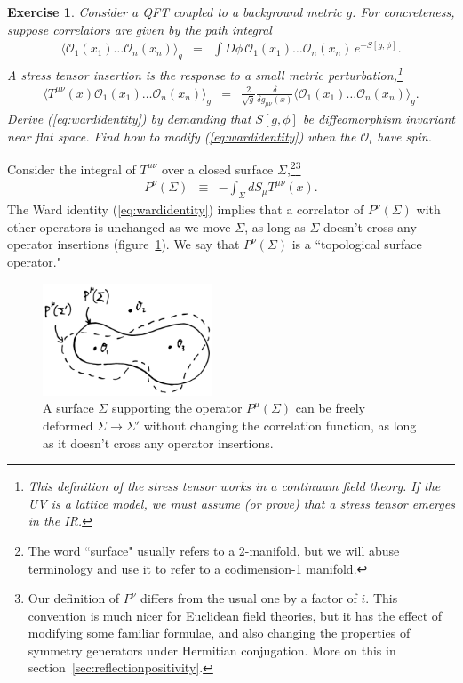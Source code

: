 \documentclass[11pt]{ws-rv9x6}
\newcommand\be{\begin{eqnarray}}
\newcommand\ee{\end{eqnarray}}
\newcommand\f\phi
\newcommand\cO{\mathcal{O}}
\newcommand\<\langle
\renewcommand\>\rangle
\newcommand\de\delta
\renewcommand\.{\cdot}
\newtheorem{exercise}{Exercise}[section]
\begin{document}
\begin{exercise}
Consider a QFT coupled to a background metric $g$. For concreteness, suppose correlators are given by the path integral
\be
\<\cO_1(x_1)\dots\cO_n(x_n)\>_g &=& \int D\phi\,\cO_1(x_1)\dots\cO_n(x_n)\, e^{-S[g,\f]}.
\ee
A stress tensor insertion is the response to a small metric perturbation,\footnote{This definition  of the stress tensor works in a continuum field theory. If the UV is a lattice model, we must assume (or prove) that a stress tensor emerges in the IR.}
\be
\label{eq:definitionofstresstensor}
\<T^{\mu\nu}(x)\cO_1(x_1)\dots\cO_n(x_n)\>_g &=& \frac{2}{\sqrt g}\frac{\de}{\de g_{\mu\nu}(x)}\<\cO_1(x_1)\dots\cO_n(x_n)\>_g.
\ee
Derive (\ref{eq:wardidentity}) by demanding that $S[g,\phi]$ be diffeomorphism invariant near flat space.  Find how to modify (\ref{eq:wardidentity}) when the $\cO_i$ have spin.
\end{exercise}


Consider the integral of $T^{\mu\nu}$ over a closed surface $\Sigma$,\footnote{The word ``surface" usually refers to a 2-manifold, but we will abuse terminology and use it to refer to a codimension-1 manifold.}\footnote{Our definition of $P^\nu$ differs from the usual one by a factor of $i$.  This convention is much nicer for Euclidean field theories, but it has the effect of modifying some familiar formulae, and also changing the properties of symmetry generators under Hermitian conjugation. More on this in section~\ref{sec:reflectionpositivity}.}
\be
P^\nu(\Sigma) &\equiv& -\int_\Sigma dS_\mu T^{\mu\nu}(x).
\ee
The Ward identity (\ref{eq:wardidentity}) implies that a correlator of $P^\nu(\Sigma)$ with other operators is unchanged as we move $\Sigma$, as long as $\Sigma$ doesn't cross any operator insertions (figure~\ref{fig:topologicalsurfaces}).
We say that $P^\nu(\Sigma)$ is a ``topological surface operator."

\begin{figure}
\begin{center}
\includegraphics[width=0.45\textwidth]{topologicalsurfaces.jpg}
\end{center}
\caption{A surface $\Sigma$ supporting the operator $P^\mu(\Sigma)$ can be freely deformed $\Sigma\to\Sigma'$ without changing the correlation function, as long as it doesn't cross any operator insertions.
\label{fig:topologicalsurfaces} }
\end{figure}
\end{document}
